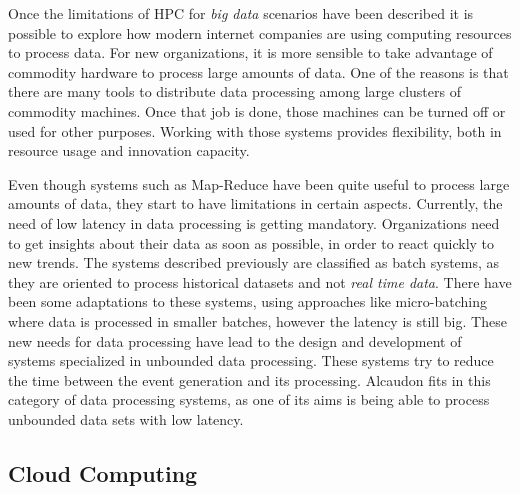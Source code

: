Once the limitations of HPC for \textit{big data} scenarios have been described
it is possible to explore how modern internet companies are using computing
resources to process data. For new organizations, it is more sensible to take
advantage of commodity hardware to process large amounts of data. One of the
reasons is that there are many tools to distribute data processing among large
clusters of commodity machines. Once that job is done, those machines can be
turned off or used for other purposes. Working with those systems provides
flexibility, both in resource usage and innovation capacity. 

Even though systems such as Map-Reduce have been quite useful to process large
amounts of data, they start to have limitations in certain aspects. Currently,
the need of low latency in data processing is getting mandatory. Organizations
need to get insights about their data as soon as possible, in order to react
quickly to new trends. The systems described previously are classified as batch
systems, as they are oriented to process historical datasets and not
\textit{real time data}. There have been some adaptations to these systems, using
approaches like micro-batching where data is processed in smaller batches,
however the latency is still big. These new needs for data processing have lead
to the design and development of systems specialized in unbounded data
processing. These systems try to reduce the time between the event generation
and its processing. Alcaudon fits in this category of data processing systems,
as one of its aims is being able to process unbounded data sets with low
latency.

\subsection{Cloud Computing}

